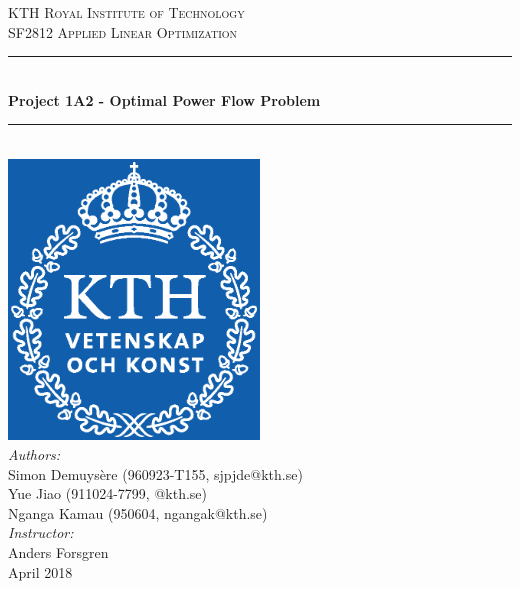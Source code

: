 \begin{titlepage}
\newcommand{\HRule}{\rule{\linewidth}{0.5mm}} 
\center 
\textsc{\LARGE KTH Royal Institute of Technology}\\[0.7cm]

\textsc{\Large SF2812 Applied Linear Optimization}\\[1cm]

\HRule \\[0.7cm]
{ \huge \bfseries Project 1A2 - Optimal Power Flow Problem }\\[0.7cm]                            
\HRule \\[1cm]
\includegraphics[width=0.5\textwidth]{Pictures/KTH_Logo.eps}\\[1cm]
\Large
\emph{Authors:}\\
Simon Demuysère (960923-T155, sjpjde@kth.se)\\
Yue Jiao (911024-7799, @kth.se)\\
Nganga Kamau (950604, ngangak@kth.se)\\[0.5cm]
\emph{Instructor:}\\
Anders Forsgren\\[0.5cm]
{\large April 2018}
\vfill 
\end{titlepage}